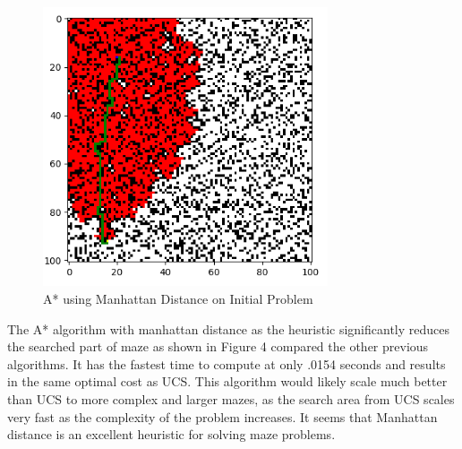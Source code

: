 \documentclass[a4paper]{article}
\begin{document}
\begin{figure}[ht]
    \centering
    \includegraphics[width=0.75\textwidth]{fig4.png}
    \caption{A* using Manhattan Distance on Initial Problem}
    \label{fig:h1}
\end{figure}
The A* algorithm with manhattan distance as the heuristic significantly reduces the searched part of maze as shown in Figure 4 compared the other previous algorithms. It has the fastest time to compute at only .0154 seconds and results in the same optimal cost as UCS. This algorithm would likely scale much better than UCS to more complex and larger mazes, as the search area from UCS scales very fast as the complexity of the problem increases. It seems that Manhattan distance is an excellent heuristic for solving maze problems.
\newpage
\end{document}
